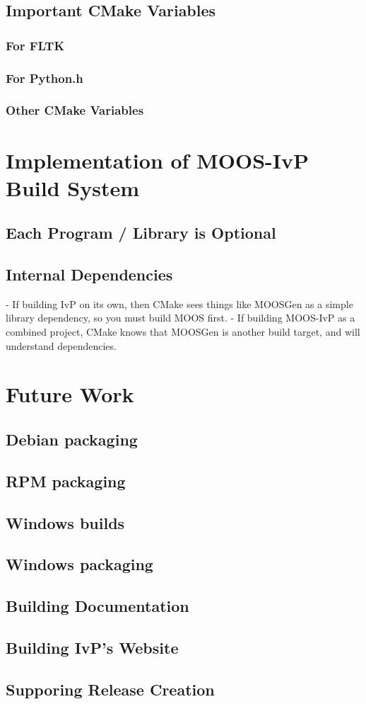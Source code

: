 \documentclass[letterpaper,10pt]{article}
\begin{document}
\subsection{Important CMake Variables}
\subsubsection{For FLTK}

\subsubsection{For Python.h}

\subsubsection{Other CMake Variables}

\section{Implementation of MOOS-IvP Build System }
\subsection{Each Program / Library is Optional}
\subsection{Internal Dependencies}
- If building IvP on its own, then CMake sees things like MOOSGen as
a simple library dependency, so you must build MOOS first.
- If building MOOS-IvP as a combined project, CMake knows that MOOSGen
is another build target, and will understand dependencies.

\section{Future Work}


\subsection{Debian packaging}

\subsection{RPM packaging}

\subsection{Windows builds}

\subsection{Windows packaging}

\subsection{Building Documentation}

\subsection{Building IvP's Website}

\subsection{Supporing Release Creation}
\end{document}
